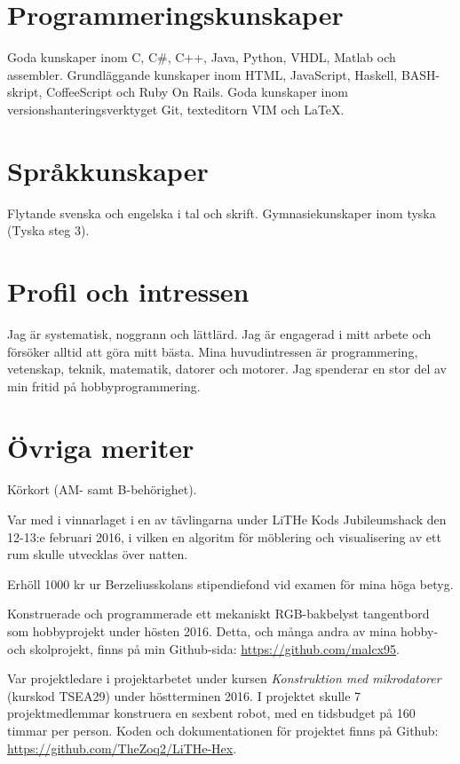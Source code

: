 \documentclass[a4paper,notitlepage]{article}
\begin{document}

\section*{Programmeringskunskaper}
Goda kunskaper inom C, C\#, C++, Java, Python, VHDL, Matlab och assembler.
Grundläggande kunskaper inom HTML, JavaScript, Haskell, BASH-skript,
CoffeeScript och Ruby On Rails. Goda kunskaper inom versionshanteringsverktyget Git, texteditorn VIM och LaTeX.

\section*{Språkkunskaper}
Flytande svenska och engelska i tal och skrift. Gymnasiekunskaper inom tyska
(Tyska steg 3).

\section*{Profil och intressen}
Jag är systematisk, noggrann och lättlärd. Jag är engagerad i mitt arbete och
försöker alltid att göra mitt bästa. Mina huvudintressen är programmering, vetenskap, 
teknik, matematik, datorer och motorer. Jag spenderar en stor del av min fritid på
hobbyprogrammering.

\section*{Övriga meriter}
Körkort (AM- samt B-behörighet).

Var med i vinnarlaget i en av tävlingarna under LiTHe Kods Jubileumshack den
12-13:e februari 2016, i vilken en algoritm för möblering och visualisering av 
ett rum skulle utvecklas över natten.

Erhöll 1000 kr ur Berzeliusskolans stipendiefond vid examen för mina höga
betyg.

Konstruerade och programmerade ett mekaniskt RGB-bakbelyst tangentbord som
hobbyprojekt under hösten 2016. Detta, och många andra av mina hobby- och skolprojekt, finns på min Github-sida: \url{https://github.com/malcx95}.

Var projektledare i projektarbetet under kursen \textit{Konstruktion med
mikrodatorer} (kurskod TSEA29) under höstterminen 2016.
I projektet skulle 7 projektmedlemmar
konstruera en sexbent robot, med en tidsbudget på 160 timmar per person. Koden
och dokumentationen för projektet finns på Github:
\url{https://github.com/TheZoq2/LiTHe-Hex}.
\end{document}
